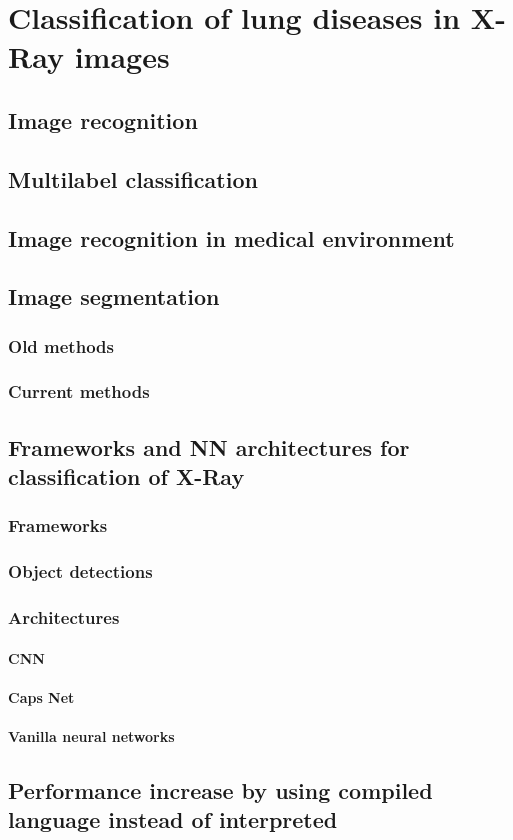 \chapter{Classification of lung diseases in X-Ray images }

\section{Image recognition}
\section{Multilabel classification}
\section{Image recognition in medical environment}
\section{Image segmentation}
    \subsection{Old methods}
    \subsection{Current methods}
\section{Frameworks and NN architectures for classification of X-Ray}
    \subsection{Frameworks}
    \subsection{Object detections}
    \subsection{Architectures}
        \subsubsection{CNN}
        \subsubsection{Caps Net}
        \subsubsection{Vanilla neural networks}
\section{Performance increase by using compiled language instead of interpreted}